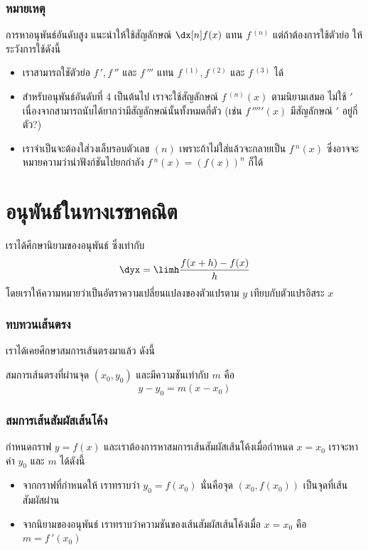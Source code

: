 \begin{frame}
\frametitle{หมายเหตุ}
\begin{remark}{}
การหาอนุพันธ์อันดับสูง แนะนำให้ใช้สัญลักษณ์ $\dx[n] f(x)$ แทน $f\,^{(n)}$ แต่ถ้าต้องการใช้ตัวย่อ ให้ระวังการใช้ดังนี้
\begin{itemize}
\item เราสามารถใชัตัวย่อ $f\,', f\,''$ และ $f\,'''$ แทน $f\,^{(1)}, f\,^{(2)}$ และ $f\,^{(3)}$ ได้ 
\item สำหรับอนุพันธ์อันดับที่ 4 เป็นต้นไป เราจะใช้สัญลักษณ์ $f\,^{(n)}(x)$ ตามนิยามเสมอ ไม่ใช้ $'$ เนื่องจากสามารถนับได้ยากว่ามีสัญลักษณ์นั้นทั้งหมดกี่ตัว (เช่น $f\,'''''(x)$ มีสัญลักษณ์ $'$ อยู่กี่ตัว?)
\item เราจำเป็นจะต้องใส่วงเล็บรอบตัวเลข $(n)$ เพราะถ้าไม่ใส่แล้วจะกลายเป็น $f\,^{n}(x)$ ซึ่งอาจจะหมายความว่านำฟังก์ชันไปยกกำลัง $f\,^n(x) = (f (x))^n$ ก็ได้
\end{itemize}
\end{remark}
\end{frame}

\section{อนุพันธ์ในทางเรขาคณิต}
\frame{\sectionpage}

\begin{frame}
เราได้ศึกษานิยามของอนุพันธ์ ซึ่งเท่ากับ
\[\dyx = \limh \frac{f(x+h)-f(x)}{h}\]
โดยเราให้ความหมายว่าเป็นอัตราความเปลี่ยนแปลงของตัวแปรตาม $y$ เทียบกับตัวแปรอิสระ $x$
\end{frame}

\begin{frame}
\frametitle{ทบทวนเส้นตรง}
เราได้เคยศึกษาสมการเส้นตรงมาแล้ว ดังนี้
\begin{thm}{}{}
สมการเส้นตรงที่ผ่านจุด $(x_0, y_0)$ \pa และมีความชันเท่ากับ $m$ \pa คือ
\begin{equation} 
y-y_0 = m(x-x_0) \label{eq:applied_basic_line}
\end{equation} 
\end{thm}
\end{frame}

\begin{frame}
\frametitle{สมการเส้นสัมผัสเส้นโค้ง}
กำหนดกราฟ $y=f(x)$ และเราต้องการหาสมการเส้นสัมผัสเส้นโค้งเมื่อกำหนด $x=x_0$ เราจะหาค่า $y_0$ และ $m$ ได้ดังนี้
\begin{itemize}
\item จากกราฟที่กำหนดให้ เราทราบว่า $y_0 = f(x_0)$ นั่นคือจุด $(x_0, f(x_0))$ เป็นจุดที่เส้นสัมผัสผ่าน
\item จากนิยามของอนุพันธ์ เราทราบว่าความชันของเส้นสัมผัสเส้นโค้งเมื่อ $x=x_0$ คือ $m = f\,'(x_0)$
\end{itemize}
\end{frame}

